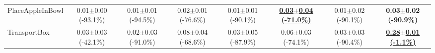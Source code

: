 \begin{table}[htbp]
\begin{adjustbox}{max width=\textwidth}
\begin{tabular}{l*{7}{c}}
PlaceAppleInBowl & 0.01$\pm$0.00 \scriptsize{(-93.1\%)} & 0.01$\pm$0.01 \scriptsize{(-94.5\%)} & 0.02$\pm$0.01 \scriptsize{(-76.6\%)} & 0.01$\pm$0.01 \scriptsize{(-90.1\%)} & \textbf{\underline{0.03$\pm$0.04 \scriptsize{(-71.0\%)}}} & 0.01$\pm$0.02 \scriptsize{(-90.1\%)} & \textbf{0.03$\pm$0.02 \scriptsize{(-90.9\%)}} \\
TransportBox & 0.03$\pm$0.03 \scriptsize{(-42.1\%)} & 0.02$\pm$0.03 \scriptsize{(-91.0\%)} & 0.08$\pm$0.04 \scriptsize{(-68.6\%)} & 0.03$\pm$0.05 \scriptsize{(-87.9\%)} & 0.06$\pm$0.03 \scriptsize{(-74.1\%)} & 0.03$\pm$0.03 \scriptsize{(-90.4\%)} & \textbf{\underline{0.28$\pm$0.01 \scriptsize{(-1.1\%)}}} \\
\bottomrule
\end{tabular}
\end{adjustbox}
\end{table}

